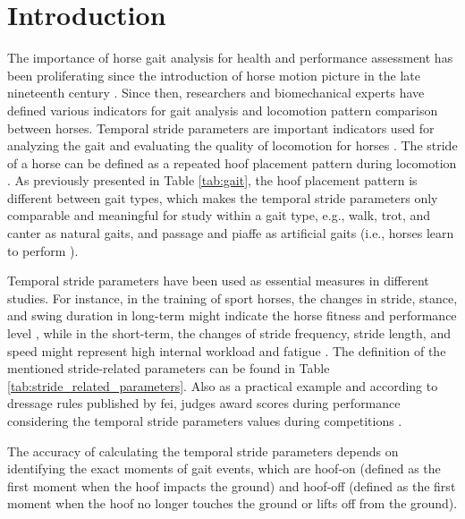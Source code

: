 \section{Introduction}
\label{sec:intro_introduction_step}


The importance of horse gait analysis for health and performance assessment has been proliferating since the introduction of horse motion picture in the late nineteenth century \cite{eadweardmuybridge_1899_animals}. Since then, researchers and biomechanical experts have defined various indicators for gait analysis and locomotion pattern comparison between horses. Temporal stride parameters are important indicators used for analyzing the gait and evaluating the quality of locomotion for horses \cite{hobbs_2020_a}. The stride of a horse can be defined as a repeated hoof placement pattern during locomotion \cite{leach_1984_standardised}. As previously presented in Table \ref{tab:gait}, the hoof placement pattern is different between gait types, which makes the temporal stride parameters only comparable and meaningful for study within a gait type, e.g., walk, trot, and canter as natural gaits, and passage and piaffe as artificial gaits (i.e., horses learn to perform \cite{clayton_2019_a}). 

Temporal stride parameters have been used as essential measures in different studies. For instance, in the training of sport horses, the changes in stride, stance, and swing duration in long-term might indicate the horse fitness and performance level \cite{parkes_2019_the}, while in the short-term, the changes of stride frequency, stride length, and speed might represent high internal workload and fatigue \cite{wickler_2006_stride}. The definition of the mentioned stride-related parameters can be found in Table \ref{tab:stride_related_parameters}. Also as a practical example and according to dressage rules published by \gls{fei}, judges award scores during performance considering the temporal stride parameters values during competitions \cite{fdrationequestreinternationale_dressage}.


\vspace{-1cm}
The accuracy of calculating the temporal stride parameters depends on identifying the exact moments of gait events, which are hoof-on (defined as the first moment when the hoof impacts the ground) and hoof-off (defined as the first moment when the hoof no longer touches the ground or lifts off from the ground). 

